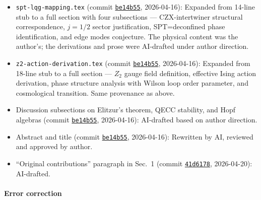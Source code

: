 \documentclass[preprint]{SciPost}
\theoremstyle{plain} %
\begin{document}
\begin{itemize}
\item \texttt{spt-lqg-mapping.tex} (commit \href{https://github.com/space-cadet/timesarrow/commit/be14b55}{\texttt{be14b55}}, 2026-04-16): Expanded from 14-line stub to a full section with four subsections --- CZX-intertwiner structural correspondence, $j=1/2$ sector justification, SPT=deconfined phase identification, and edge modes conjecture. The physical content was the author's; the derivations and prose were AI-drafted under author direction.
\item \texttt{z2-action-derivation.tex} (commit \href{https://github.com/space-cadet/timesarrow/commit/be14b55}{\texttt{be14b55}}, 2026-04-16): Expanded from 18-line stub to a full section --- $Z_2$ gauge field definition, effective Ising action derivation, phase structure analysis with Wilson loop order parameter, and cosmological transition. Same provenance as above.
\item Discussion subsections on Elitzur's theorem, QECC stability, and Hopf algebras (commit \href{https://github.com/space-cadet/timesarrow/commit/be14b55}{\texttt{be14b55}}, 2026-04-16): AI-drafted based on author direction.
\item Abstract and title (commit \href{https://github.com/space-cadet/timesarrow/commit/be14b55}{\texttt{be14b55}}, 2026-04-16): Rewritten by AI, reviewed and approved by author.
\item ``Original contributions'' paragraph in Sec.~1 (commit \href{https://github.com/space-cadet/timesarrow/commit/41d6178}{\texttt{41d6178}}, 2026-04-20): AI-drafted.
\end{itemize}

\paragraph{Error correction}
\end{document}
